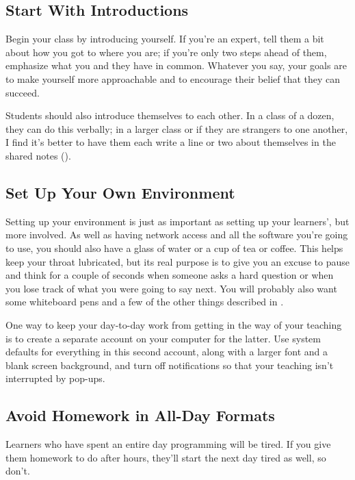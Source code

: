 \subsection*{Start With Introductions}

Begin your class by introducing yourself.
If you're an expert,
tell them a bit about how you got to where you are;
if you're only two steps ahead of them,
emphasize what you and they have in common.
Whatever you say,
your goals are to make yourself more approachable
and to encourage their belief that they can succeed.

Students should also introduce themselves to each other.
In a class of a dozen,
they can do this verbally;
in a larger class or if they are strangers to one another,
I find it's better to have them each write a line or two about themselves
in the shared notes ().

\subsection*{Set Up Your Own Environment}

Setting up your environment is just as important as setting up your learners',
but more involved.
As well as having network access and all the software you're going to use,
you should also have a glass of water
or a cup of tea or coffee.
This helps keep your throat lubricated,
but its real purpose is to give you an excuse to pause and think for a couple of seconds
when someone asks a hard question
or when you lose track of what you were going to say next.
You will probably also want some whiteboard pens
and a few of the other things described in .

One way to keep your day-to-day work from getting in the way of your teaching
is to create a separate account on your computer for the latter.
Use system defaults for everything in this second account,
along with a larger font and a blank screen background,
and turn off notifications so that your teaching isn't interrupted by pop-ups.

\subsection*{Avoid Homework in All-Day Formats}

Learners who have spent an entire day programming will be tired.
If you give them homework to do after hours,
they'll start the next day tired as well,
so don't.

